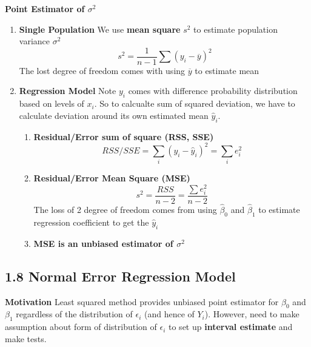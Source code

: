 \documentclass[11pt]{article}
\begin{document}
\begin{defn*}
    \textbf{Point Estimator of $\sigma^2$} 
    \begin{enumerate}
        \item \textbf{Single Population} We use \textbf{mean square} $s^2$ to estimate population variance $\sigma^2$
        \[
            s^2 = \frac{1}{n-1} \sum (y_i - \overline{y})^2
        \]
        The lost degree of freedom comes with using $\overline{y}$ to estimate mean
        \item \textbf{Regression Model} Note $y_i$ comes with difference probability distribution based on levels of $x_i$. So to calcualte sum of squared deviation, we have to calculate deviation around its own estimated mean $\hat{y}_i$.
        \begin{enumerate}
            \item \textbf{Residual/Error sum of square (RSS, SSE)}
            \[
                RSS/SSE = \sum_{i} (y_i - \hat{y}_i)^2 = \sum_i e_i^2
            \]
            \item \textbf{Residual/Error Mean Square (MSE)}
            \[
                s^2 = \frac{RSS}{n-2} = \frac{\sum e_i^2}{n-2}
            \]
            The loss of 2 degree of freedom comes from using $\hat{\beta}_0$ and $\hat{\beta}_1$ to estimate regression coefficient to get the $\hat{y}_i$
            \item \textbf{MSE is an unbiased estimator of $\sigma^2$}
        \end{enumerate}
    \end{enumerate}
\end{defn*}


\subsection*{1.8 Normal Error Regression Model}

\begin{note}
    \textbf{Motivation} Least squared method provides unbiased point estimator for $\beta_0$ and $\beta_1$ regardless of the distribution of $\epsilon_i$ (and hence of $Y_i$). However, need to make assumption about form of distribution of $\epsilon_i$ to set up \textbf{interval estimate} and make tests. 
\end{note}
\end{document}
